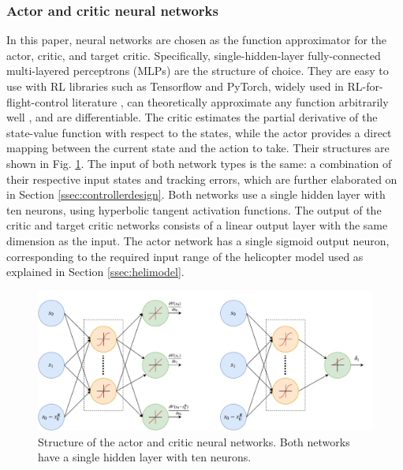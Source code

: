 \subsubsection{Actor and critic neural networks} \label{ssec:neuralnetworks}
In this paper, neural networks are chosen as the function approximator for the actor, critic, and target critic. Specifically, single-hidden-layer fully-connected multi-layered perceptrons (MLPs) are the structure of choice. They are easy to use with RL libraries such as Tensorflow and PyTorch, widely used in RL-for-flight-control literature \cite{Bertsekas2000, Enns2002, Enns2003a, Enns2003b, Ferrari2004, VanKampen2006, Prokhorov1995, Balakrishnan1996, Prokhorov1997, Zhou2016HDP, Zhou2018DHP, Heyer2020}, can theoretically approximate any function arbitrarily well \cite{Hornik1989}, and are differentiable. The critic estimates the partial derivative of the state-value function with respect to the states, while the actor provides a direct mapping between the current state and the action to take. Their structures are shown in Fig. \ref{fig:nn_structure}. The input of both network types is the same: a combination of their respective input states and tracking errors, which are further elaborated on in Section \ref{ssec:controllerdesign}. Both networks use a single hidden layer with ten neurons, using hyperbolic tangent activation functions. The output of the critic and target critic networks consists of a linear output layer with the same dimension as the input. The actor network has a single sigmoid output neuron, corresponding to the required input range of the helicopter model used as explained in Section \ref{ssec:helimodel}.

\begin{figure}[hb]
    \centering
    \includegraphics[width=\textwidth, trim={0 0 0.4cm 0.4cm}, clip]{fig/2/NNs2.pdf}
    \caption{Structure of the actor and critic neural networks. Both networks have a single hidden layer with ten neurons. }
    \label{fig:nn_structure}
\end{figure}

